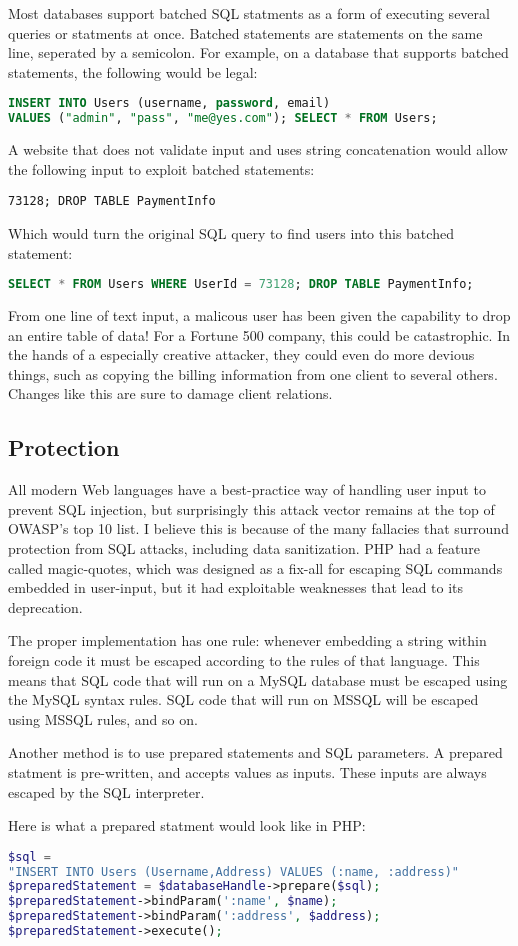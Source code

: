Most databases support batched SQL statments as a form of executing several queries or statments at once. Batched statements are statements on the same line, seperated by a semicolon. For example, on a database that supports batched statements, the following would be legal:
\begin{lstlisting}[language = SQL]
INSERT INTO Users (username, password, email) 
VALUES ("admin", "pass", "me@yes.com"); SELECT * FROM Users;
\end{lstlisting}
A website that does not validate input and uses string concatenation would allow the following input to exploit batched statements:
\begin{verbatim}
73128; DROP TABLE PaymentInfo
\end{verbatim}
Which would turn the original SQL query to find users into this batched statement:
\begin{lstlisting}[language = SQL]
SELECT * FROM Users WHERE UserId = 73128; DROP TABLE PaymentInfo; 
\end{lstlisting}
From one line of text input, a malicous user has been given the capability to drop an entire table of data! For a Fortune 500 company, this could be catastrophic. In the hands of a especially creative attacker, they could even do more devious things, such as copying the billing information from one client to several others. Changes like this are sure to damage client relations.

\subsection{Protection}

All modern Web languages have a best-practice way of handling user input to prevent SQL injection, but surprisingly this attack vector remains at the top of OWASP's top 10 list. I believe this is because of the many fallacies that surround protection from SQL attacks, including data sanitization. PHP had a feature called magic-quotes, which was designed as a fix-all for escaping SQL commands embedded in user-input, but it had exploitable weaknesses that lead to its deprecation.

The proper implementation has one rule: whenever embedding a string within foreign code it must be escaped according to the rules of that language. This means that SQL code that will run on a MySQL database must be escaped using the MySQL syntax rules. SQL code that will run on MSSQL will be escaped using MSSQL rules, and so on.
 
Another method is to use prepared statements and SQL parameters. A prepared statment is pre-written, and accepts values as inputs. These inputs are always escaped by the SQL interpreter. 

Here is what a prepared statment would look like in PHP:
\begin{lstlisting}[language = PHP]
$sql = 
"INSERT INTO Users (Username,Address) VALUES (:name, :address)"
$preparedStatement = $databaseHandle->prepare($sql);
$preparedStatement->bindParam(':name', $name);
$preparedStatement->bindParam(':address', $address);
$preparedStatement->execute();
\end{lstlisting}